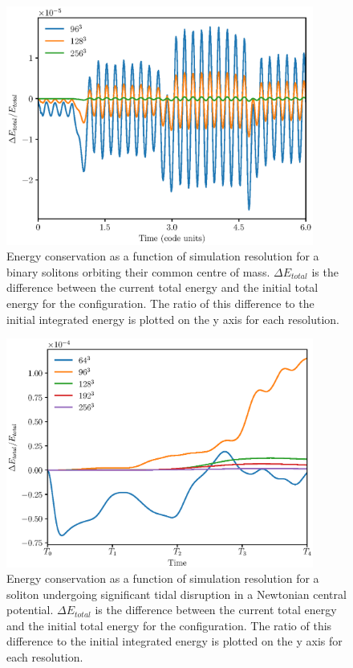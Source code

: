 \documentclass[a4paper,11pt]{article}
\begin{document}
\begin{figure}
  \includegraphics[width=0.9\textwidth,trim=0 0.5cm 0 0,clip]{Total_Energy_Change.eps}
  \caption{Energy conservation as a function  of  simulation resolution for a binary solitons orbiting their common centre of mass. $\Delta E_{total}$ is the difference between the current total energy and the initial total energy for the configuration. The ratio of this difference to the initial integrated energy is plotted on the y axis for each resolution.}
  \label{fig:energy_change}
\end{figure}

\begin{figure}
  \includegraphics[width=0.9\textwidth,trim=0 0.5cm 0 0,clip]{Total_Energy_Change_Disruption.eps}
  \caption{Energy conservation as a function of simulation resolution for a soliton undergoing significant tidal disruption in a Newtonian central potential. $\Delta E_{total}$ is the difference between the current total energy and the initial total energy for the configuration. The ratio of this difference to the initial integrated energy is plotted on the y axis for each resolution.}
  \label{fig:energy_change_2}
\end{figure}
\end{document}
